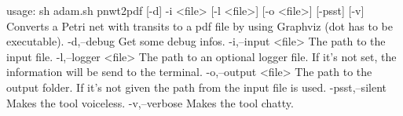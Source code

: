 usage: sh adam.sh pnwt2pdf [-d] -i <file> [-l <file>] [-o <file>] [-psst]
       [-v]
Converts a Petri net with transits to a pdf file by using Graphviz (dot
has to be executable).
 -d,--debug           Get some debug infos.
 -i,--input <file>    The path to the input file.
 -l,--logger <file>   The path to an optional logger file. If it's not
                      set, the information will be send to the terminal.
 -o,--output <file>   The path to the output folder. If it's not given the
                      path from the input file is used.
 -psst,--silent       Makes the tool voiceless.
 -v,--verbose         Makes the tool chatty.
